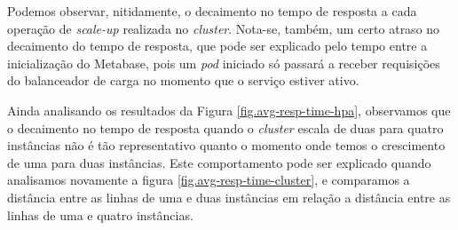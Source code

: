 Podemos observar, nitidamente, o decaimento no tempo de resposta a cada operação de \textit{scale-up} realizada no \textit{cluster}. Nota-se, também, um certo atraso no decaimento do tempo de resposta, que pode ser explicado pelo tempo entre a inicialização do Metabase, pois um \textit{pod} iniciado só passará a receber requisições do balanceador de carga no momento que o serviço estiver ativo.

Ainda analisando os resultados da Figura \ref{fig.avg-resp-time-hpa}, observamos que o decaimento no tempo de resposta quando o \textit{cluster} escala de duas para quatro instâncias não é tão representativo quanto o momento onde temos o crescimento de uma para duas instâncias. Este comportamento pode ser explicado quando analisamos novamente a figura \ref{fig.avg-resp-time-cluster}, e comparamos a distância entre as linhas de uma e duas instâncias em relação a distância entre as linhas de uma e quatro instâncias.


